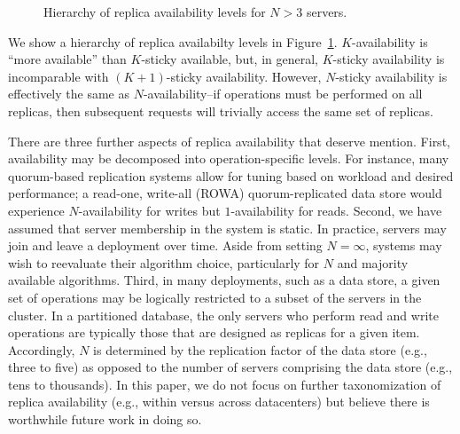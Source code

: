 \begin{figure}
\centering
{}
\label{fig:availability-order}
\caption{Hierarchy of replica availability levels for $N>3$ servers.}
\end{figure}

We show a hierarchy of replica availabilty levels in
Figure~\ref{fig:availability-order}. $K$-availability is ``more
available'' than $K$-sticky available, but, in general, $K$-sticky
availability is incomparable with $(K+1)$-sticky
availability. However, $N$-sticky availability is effectively the same
as $N$-availability--if operations must be performed on all replicas,
then subsequent requests will trivially access the same set of
replicas.

There are three further aspects of replica availability that deserve
mention. First, availability may be decomposed into operation-specific
levels. For instance, many quorum-based replication systems allow for
tuning based on workload and desired performance; a read-one,
write-all (ROWA) quorum-replicated data store would experience
$N$-availability for writes but $1$-availability for reads. Second, we
have assumed that server membership in the system is static. In
practice, servers may join and leave a deployment over time. Aside
from setting $N=\infty$, systems may wish to reevaluate their
algorithm choice, particularly for $N$ and majority available
algorithms. Third, in many deployments, such as a data store, a given
set of operations may be logically restricted to a subset of the
servers in the cluster. In a partitioned database, the only servers
who perform read and write operations are typically those that are
designed as replicas for a given item. Accordingly, $N$ is determined
by the replication factor of the data store (e.g., three to five) as
opposed to the number of servers comprising the data store (e.g., tens
to thousands). In this paper, we do not focus on further
taxonomization of replica availability (e.g., within versus across
datacenters) but believe there is worthwhile future work in doing so.

